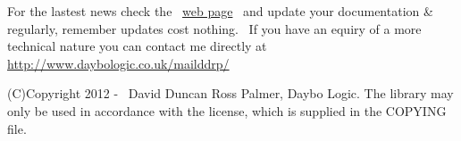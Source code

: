 \documentclass{article}
\begin{document}
\par For the lastest news check the~ \href{http://bitbucket.org/daybologic/dlpodget}{web
page}~ and update your documentation \& regularly,
remember
updates cost nothing.~ If you have an equiry of a more technical
nature
you can contact me directly at \href{http://www.daybologic.co.uk/mailddrp/}{\url{http://www.daybologic.co.uk/mailddrp/}}\href{mailto:2e0eol@gmail.com}{}


\par (C)Copyright 2012 -
\the\year
~David Duncan Ross Palmer, Daybo Logic. The library may only be used in accordance
with
the license, which is supplied in the COPYING file.\\
\end{document}
